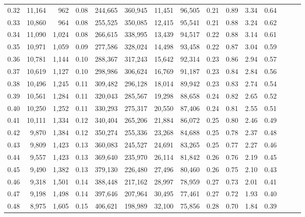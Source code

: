 \begin{tabular}{rrrrrrrrrrrrrrr}
0.32 &  11,164 &    962 &  0.08 &  244,665 &  360,945 &   11,451 &   96,505 &  0.21 &  0.89 &  3.34 &      0.64 \\
0.33 &  10,860 &    964 &  0.08 &  255,525 &  350,085 &   12,415 &   95,541 &  0.21 &  0.88 &  3.24 &      0.62 \\
0.34 &  11,090 &  1,024 &  0.08 &  266,615 &  338,995 &   13,439 &   94,517 &  0.22 &  0.88 &  3.14 &      0.61 \\
0.35 &  10,971 &  1,059 &  0.09 &  277,586 &  328,024 &   14,498 &   93,458 &  0.22 &  0.87 &  3.04 &      0.59 \\
0.36 &  10,781 &  1,144 &  0.10 &  288,367 &  317,243 &   15,642 &   92,314 &  0.23 &  0.86 &  2.94 &      0.57 \\
0.37 &  10,619 &  1,127 &  0.10 &  298,986 &  306,624 &   16,769 &   91,187 &  0.23 &  0.84 &  2.84 &      0.56 \\
0.38 &  10,496 &  1,245 &  0.11 &  309,482 &  296,128 &   18,014 &   89,942 &  0.23 &  0.83 &  2.74 &      0.54 \\
0.39 &  10,561 &  1,284 &  0.11 &  320,043 &  285,567 &   19,298 &   88,658 &  0.24 &  0.82 &  2.65 &      0.52 \\
0.40 &  10,250 &  1,252 &  0.11 &  330,293 &  275,317 &   20,550 &   87,406 &  0.24 &  0.81 &  2.55 &      0.51 \\
0.41 &  10,111 &  1,334 &  0.12 &  340,404 &  265,206 &   21,884 &   86,072 &  0.25 &  0.80 &  2.46 &      0.49 \\
0.42 &   9,870 &  1,384 &  0.12 &  350,274 &  255,336 &   23,268 &   84,688 &  0.25 &  0.78 &  2.37 &      0.48 \\
0.43 &   9,809 &  1,423 &  0.13 &  360,083 &  245,527 &   24,691 &   83,265 &  0.25 &  0.77 &  2.27 &      0.46 \\
0.44 &   9,557 &  1,423 &  0.13 &  369,640 &  235,970 &   26,114 &   81,842 &  0.26 &  0.76 &  2.19 &      0.45 \\
0.45 &   9,490 &  1,382 &  0.13 &  379,130 &  226,480 &   27,496 &   80,460 &  0.26 &  0.75 &  2.10 &      0.43 \\
0.46 &   9,318 &  1,501 &  0.14 &  388,448 &  217,162 &   28,997 &   78,959 &  0.27 &  0.73 &  2.01 &      0.41 \\
0.47 &   9,198 &  1,498 &  0.14 &  397,646 &  207,964 &   30,495 &   77,461 &  0.27 &  0.72 &  1.93 &      0.40 \\
0.48 &   8,975 &  1,605 &  0.15 &  406,621 &  198,989 &   32,100 &   75,856 &  0.28 &  0.70 &  1.84 &      0.39 \\

\end{tabular}
